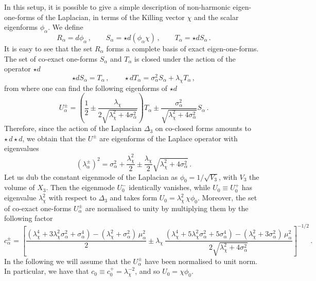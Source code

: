 \documentclass[11pt]{article}
\def\a {\alpha}
\begin{document}
In this setup, it is possible to give a simple description of non-harmonic eigen-one-forms of the Laplacian, in terms of the Killing vector $\chi$ and the scalar eigenforms $\phi_\a$. We define 
\begin{equation}
	R_\a = d \phi_\a \,, \qquad S_\a = \star d (\phi_\a \chi ) \,, \qquad T_\a = \star d S_\a \,. \label{eq: BandC}
\end{equation}
It is easy to see that the set $R_\a$ forms a complete basis of exact eigen-one-forms. The set of co-exact one-forms $S_\a$ and $T_\a$ is closed under the action of the operator $ \star d$
\begin{equation}
	\star d S_\a = T_\a \,, \qquad \star d T_\a = \sigma_\a^2 S_\a +  \lambda_\chi T_\a\, ,
\end{equation}
from where one can find the following eigenforms of $\star d$
\begin{equation}
	U^\pm_\a = \left(\frac{1}{2}\pm\frac{ \lambda_\chi}{2 \sqrt{ \lambda_\chi^2 + 4 \sigma_\a^2}}\right) T_\a \pm \frac{\sigma_\a^2}{\sqrt{ \lambda_\chi^2 + 4 \sigma_\a^2}}S_\a \,.  \label{eq: Dpm}
\end{equation}
Therefore, since the action of the Laplacian $\Delta_3$ on co-closed forms amounts to $\star \, d \star d$, we obtain that the $U^\pm$ are eigenforms of the Laplace operator with eigenvalues
\begin{equation}
	(\lambda^\pm_\a)^2 = \sigma_\a^2 + \frac{ \lambda_\chi^2}{2} \pm \frac{ \lambda_\chi}{2}\sqrt{ \lambda_\chi^2 + 4 \sigma_\a^2 } \,.\label{eq: lambdapm}
\end{equation} 
Let us dub the constant eigenmode of the Laplacian as $\phi_0 = 1/\sqrt{V_3}$, with $V_3$ the volume of $X_3$. Then the eigenmode $U_0^-$ identically vanishes, while $U_0 \equiv U_0^+$ has eigenvalue $ \lambda_\chi^2$  with respect to $\Delta_3$ and takes form $U_0 =  \lambda_\chi^2 \, \chi \phi_0$. Moreover, the set of co-exact one-forms $U^\pm_\a $ are normalised to unity by multiplying them by the following factor 
\begin{equation}
c_\a^{\pm} = \left[\frac{( \lambda_\chi^4+3 \lambda_\chi^2 \sigma_\a^2+\sigma_\a^4) - ( \lambda_\chi^2+\sigma_\a^2)\,\mu_\a^2}{2} \pm   \lambda_\chi \, \frac{( \lambda_\chi^4 + 5 \lambda_\chi^2 \sigma_\a^2 + 5\sigma_\a^4)-( \lambda_\chi^2+3\sigma_\a^2)\,\mu_\a^2}{2 \sqrt{ \lambda_\chi^2 + 4 \sigma_\a^2}}\right]^{-1/2}\,.
\end{equation}
In the following we will assume that the $U_\a^{\pm}$ have been normalised to unit norm. In particular, we have that $c_0 \equiv c_0^+ =  \lambda_\chi^{-2}$, and so $U_0 = \chi \phi_0$. 
\end{document}

